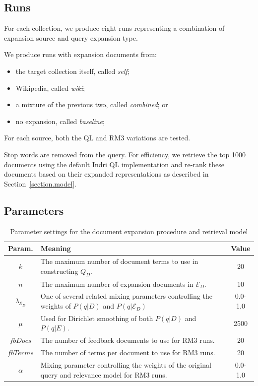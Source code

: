 \documentclass[sigconf]{acmart}
\begin{document}
\subsection{Runs}\label{section.evaluation.runs}

For each collection, we produce eight runs representing a combination of expansion source and query expansion type.

We produce runs with expansion documents from:
\begin{itemize}
	\item the target collection itself, called \textit{self};
	\item Wikipedia, called \textit{wiki};
	\item a mixture of the previous two, called \textit{combined}; or
	\item no expansion, called \textit{baseline};
\end{itemize}

\noindent For each source, both the QL and RM3 variations are tested.

Stop words are removed from the query. For efficiency, we retrieve the top 1000 documents using the default Indri QL implementation and re-rank these documents based on their expanded representations as described in Section~\ref{section.model}.

\subsection{Parameters}\label{section.evaluation.parameters}

\begin{table}[htb]
\centering
\begin{tabular}{|c|p{}|c|} \hline
{\bf Param.} & {\bf Meaning} & {\bf Value} \\ \hline
$k$ & The maximum number of document terms to use in constructing $Q_D$. & 20 \\ \hline
$n$ & The maximum number of expansion documents in $\mathcal{E}_D$. & 10 \\ \hline
$\lambda_{\mathcal{E}_D}$ & One of several related mixing parameters controlling the weights of $P(q|D)$ and $P(q|\mathcal{E}_D)$ & 0.0-1.0 \\ \hline
$\mu$ & Used for Dirichlet smoothing of both $P(q|D)$ and $P(q|E)$. & 2500 \\ \hline
$fbDocs$ & The number of feedback documents to use for RM3 runs. & 20 \\ \hline
$fbTerms$ & The number of terms per document to use for RM3 runs. & 20 \\ \hline
$\alpha$ & Mixing parameter controlling the weights of the original query and relevance model for RM3 runs. & 0.0-1.0 \\ \hline
\end{tabular}
\caption{Parameter settings for the document expansion procedure and retrieval model}
\label{table.parameters}
\end{table}
\end{document}

